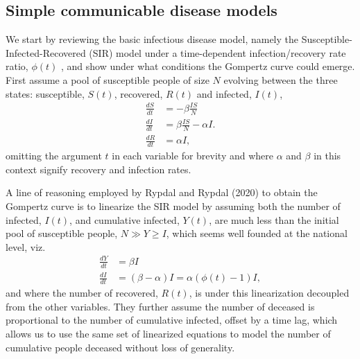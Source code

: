 \documentclass{article}
\begin{document}
\subsection*{Simple communicable disease models}
We start by reviewing the basic infectious disease model, namely the Susceptible-Infected-Recovered (SIR) model under a time-dependent infection/recovery rate ratio, $\phi(t)$ \cite{kermack1927contribution}, and show under what conditions the Gompertz curve could emerge. First assume a pool of susceptible people of size $N$ evolving between the three states: susceptible, $S(t)$, recovered, $R(t)$ and infected, $I(t)$,
\begin{align}
\label{eq:SIR}
\frac{dS}{dt}& = -\beta \frac{IS}{N}\nonumber\\
\frac{dI}{dt}& = \beta \frac{IS}{N} - \alpha I.\\
\frac{dR}{dt}& = \alpha I\nonumber,
\end{align}
omitting the argument $t$ in each variable for brevity and where $\alpha$ and $\beta$ in this context signify recovery and infection rates.

A line of reasoning employed by Rypdal and Rypdal (2020) \cite{Rypdal2020} to obtain the Gompertz curve is to linearize the SIR model by assuming
both the number of infected, $I(t)$, and cumulative infected, $Y(t)$, are much less than the initial pool of susceptible people, $N \gg Y \ge I$, which seems well founded at the national level, viz.
\begin{align}
\label{eq:linSIR}
\frac{dY}{dt}& = \beta I\\
\frac{dI}{dt}& = (\beta - \alpha) I = \alpha (\phi(t) - 1) I,
\end{align}
and where the number of recovered, $R(t)$, is under this linearization decoupled from the other variables. They further assume the number of deceased is proportional to the number of cumulative infected, offset by a time lag, which allows us to use the same set of linearized equations to model the number of cumulative people deceased without loss of generality.
\end{document}

